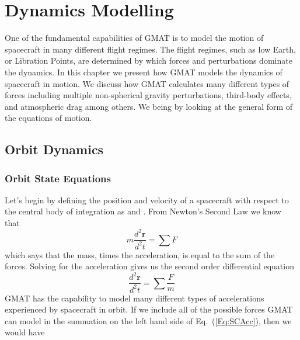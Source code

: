\chapter{Dynamics Modelling}

One of the fundamental capabilities of GMAT is to model the motion
of spacecraft in many different flight regimes.  The flight regimes,
such as low Earth, or Libration Points, are determined by which
forces and perturbations dominate the dynamics.  In this chapter we
present how GMAT models the dynamics of spacecraft in motion.  We
discuss how GMAT calculates many different types of forces including
multiple non-spherical gravity perturbations, third-body effects,
and atmospheric drag among others. We being by looking at the
general form of the equations of motion.

\section{Orbit Dynamics}


\subsection{Orbit State Equations}

 Let's begin by defining the position and velocity of a
spacecraft with respect to the central body of integration as \br
and \bv. From Newton's Second Law we know that
%
\begin{equation}
    m \frac{d^2 \mathbf{r}}{d^2 t} = \sum F
\end{equation}
%
which says that the mass, times the acceleration, is equal to the
sum of the forces.  Solving for the acceleration gives us the
second order differential equation
%
\begin{equation}
   \frac{d^2 \mathbf{r}}{d^2 t} = \sum \frac{F}{m}
   \label{Eq:SCAcc}
\end{equation}
%
GMAT has the capability to model many different types of
accelerations experienced by spacecraft in orbit.  If we include
all of the possible forces GMAT can model in the summation on the
left hand side of Eq.~(\ref{Eq:SCAcc}), then we would have

